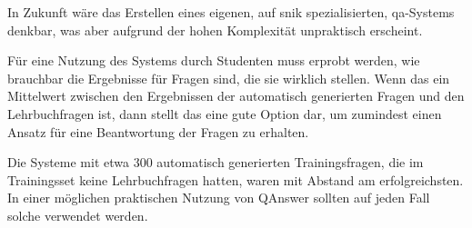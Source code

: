 In Zukunft wäre das Erstellen eines eigenen, auf \ac{snik} spezialisierten, \ac{qa}-Systems denkbar, was aber aufgrund der hohen Komplexität unpraktisch erscheint.

Für eine Nutzung des Systems durch Studenten muss erprobt werden, wie brauchbar die Ergebnisse für Fragen sind, die sie wirklich stellen.
Wenn das ein Mittelwert zwischen den Ergebnissen der automatisch generierten Fragen und den Lehrbuchfragen ist, dann stellt das eine gute Option dar,
um zumindest einen Ansatz für eine Beantwortung der Fragen zu erhalten.

Die Systeme mit etwa 300 automatisch generierten Trainingsfragen, die im Trainingsset keine Lehrbuchfragen hatten, waren mit Abstand am erfolgreichsten.
In einer möglichen praktischen Nutzung von QAnswer sollten auf jeden Fall solche verwendet werden.